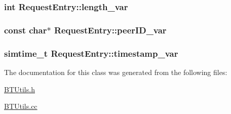 \subsubsection[{length\+\_\+var}]{\setlength{\rightskip}{0pt plus 5cm}int Request\+Entry\+::length\+\_\+var\hspace{0.3cm}{\ttfamily [protected]}}\label{classRequestEntry_aa52549120084c3fccd2101678e84c6fe}
\hypertarget{classRequestEntry_a0b527dea15dd777cd9267ab9bc5ccdc2}{}
\subsubsection[{peer\+I\+D\+\_\+var}]{\setlength{\rightskip}{0pt plus 5cm}const char$\ast$ Request\+Entry\+::peer\+I\+D\+\_\+var\hspace{0.3cm}{\ttfamily [protected]}}\label{classRequestEntry_a0b527dea15dd777cd9267ab9bc5ccdc2}
\hypertarget{classRequestEntry_aeb81ed7dd1b44291051176524448c7c9}{}
\subsubsection[{timestamp\+\_\+var}]{\setlength{\rightskip}{0pt plus 5cm}simtime\+\_\+t Request\+Entry\+::timestamp\+\_\+var\hspace{0.3cm}{\ttfamily [protected]}}\label{classRequestEntry_aeb81ed7dd1b44291051176524448c7c9}


The documentation for this class was generated from the following files\+:\begin{DoxyCompactItemize}
\item 
\hyperlink{BTUtils_8h}{B\+T\+Utils.\+h}\item 
\hyperlink{BTUtils_8cc}{B\+T\+Utils.\+cc}\end{DoxyCompactItemize}
